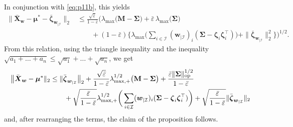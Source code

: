\documentclass[aos,preprint,reqno]{imsart}
\newcommand\bs{\boldsymbol}
\newcommand\bmu{\boldsymbol\mu}
\newcommand\bzeta{\boldsymbol\zeta}
\newcommand\bSigma{\boldsymbol\Sigma}
\newcommand\bw{\boldsymbol w}
\theoremstyle{plain}
\theoremstyle{remark}
\begin{document}
	In conjunction with \eqref{eq:p11b}, this yields 
	\begin{align}
	    \big\|\bar{\bs X}_{\bw} - \bmu^* - 
			\bar{\bzeta}_{\bw_{|\mathcal I}}\big\|_2
			& \leq \frac{\sqrt{\bar\varepsilon}}{1-\bar\varepsilon} \bigg(
			\lambda_{\max}\big( \mathbf{M}-\bSigma\big)
					+ \bar\varepsilon\,\lambda_{\max}\big(\bSigma\big) \\
			&\qquad +(1-\bar\varepsilon)\bigg\{  \lambda_{\max}
					\bigg(\sum_{i\in\mathcal I} (\bw_{|\mathcal I})_i(\bSigma - 
					\bzeta_i\bzeta_i^\top)\bigg)  + 
					\|\bar{\bzeta}_{\bw_{|\mathcal I}}\|_2^2
					\bigg\}\bigg)^{1/2}.
	\end{align}
	From this relation, using the triangle inequality and the inequality 
	$\sqrt{a_1+\ldots + a_n}\le \sqrt{a_1}+\ldots+\sqrt{a_n}$, we get 
	\begin{align}
	    \big\|\bar{\bs X}_{\bw} - \bmu^*\|_2&\le 
			\|\bar{\bzeta}_{\bw_{|\mathcal I}}\big\|_2
			+ \frac{\sqrt{\bar\varepsilon}}{1-\bar\varepsilon} 
			\lambda_{\max,+}^{1/2}\big( \mathbf{M}-\bSigma\big)
			+ \frac{{\bar\varepsilon}\|\bSigma\|_{\textup{op}}^{1/2}}
			{1-\bar\varepsilon}\\
			&\qquad + \sqrt{\frac{\bar\varepsilon}{1-\bar\varepsilon}}
			\lambda_{\max,+}^{1/2}
			\bigg(\sum_{i\in\mathcal I} (\bw_{|\mathcal I})_i(\bSigma - 
			\bzeta_i\bzeta_i^\top)\bigg)  + \sqrt{\frac{\bar\varepsilon}{1-
			\bar\varepsilon}}\|\bar{\bzeta}_{\bw_{|\mathcal I}}\|_2
	\end{align}
	and, after rearranging the terms, the claim of the proposition follows.

\end{document}
